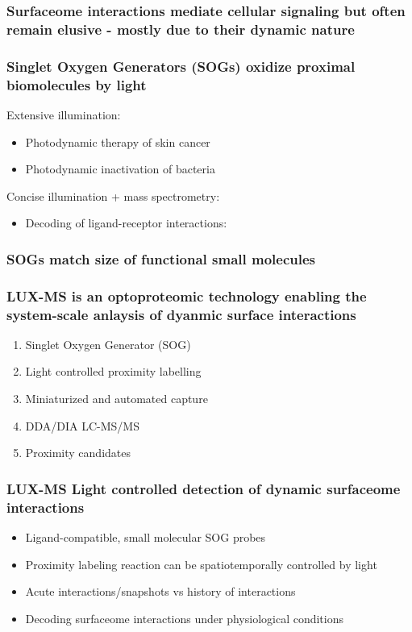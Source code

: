 \begin{itemize}
\begin{itemize}
\subsubsection{Surfaceome interactions mediate cellular signaling but often remain elusive - mostly due to their dynamic nature}
\subsubsection{Singlet Oxygen Generators (SOGs) oxidize proximal biomolecules by light}
Extensive illumination:
\begin{itemize}
    \item Photodynamic therapy of skin cancer
\item Photodynamic inactivation of bacteria
\end{itemize}
Concise illumination + mass spectrometry:
\begin{itemize}
    \item Decoding of ligand-receptor interactions:
\end{itemize} 

\subsubsection{SOGs match size of functional small molecules
}

\subsubsection{LUX-MS is an optoproteomic technology enabling the system-scale anlaysis of dyanmic surface interactions}
\begin{enumerate}
    \item Singlet Oxygen Generator (SOG)
    \item Light controlled proximity labelling
\item Miniaturized and automated capture
\item DDA/DIA LC-MS/MS 
\item Proximity candidates
\end{enumerate}
\subsubsection{LUX-MS Light controlled detection of dynamic surfaceome interactions}
\begin{itemize}
    \item Ligand-compatible, small molecular SOG probes
\item Proximity labeling reaction can be spatiotemporally controlled by light
\item Acute interactions/snapshots vs history of interactions
\item Decoding surfaceome interactions under physiological conditions
\end{itemize}


\end{itemize}
\end{itemize}
